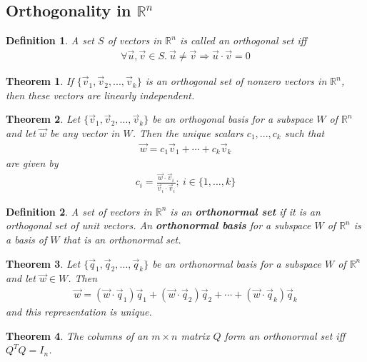 \documentclass{article}
\theoremstyle{sltheorem}
\newtheorem{definition}{Definition}[section]
\newtheorem{theorem}{Theorem}[section]
\begin{document}
\subsection{Orthogonality in $\mathbb{R}^n$}
\begin{definition}
    A set $S$ of vectors in $\mathbb{R}^n$ is called an orthogonal set iff
    \begin{align*}
        \forall \vec u, \vec v\in S.\: \vec u \not= \vec v \Rightarrow \vec u \cdot \vec v = 0
    \end{align*}
\end{definition}
\begin{theorem}
    If $\{\vec v_1, \vec v_2, ...,\vec v_k\}$ is an orthogonal set of nonzero vectors in $\mathbb{R}^n$, then these vectors are linearly independent.
\end{theorem}
\begin{theorem}
    Let $\{\vec v_1, \vec v_2, ..., \vec v_k\}$ be an orthogonal basis for a subspace $W$ of $\mathbb{R}^n$ and let $\vec w$ be any vector in $W$. Then the unique scalars $c_1, ..., c_k$ such that
    \begin{align*}
        \vec w = c_1\vec v_1 + \cdots + c_k\vec v_k
    \end{align*}
    are given by
    \begin{align*}
        c_i = \frac{\vec w \cdot \vec v_i}{\vec v_i \cdot \vec v_i}; \: i \in \{1, ..., k\}
    \end{align*}
\end{theorem}
\begin{definition}
    A set of vectors in $\mathbb{R}^n$ is an \textbf{orthonormal set} if it is an orthogonal set of unit vectors. An \textbf{orthonormal basis} for a subspace $W$ of $\mathbb{R}^n$ is a basis of $W$ that is an orthonormal set. 
\end{definition}
\begin{theorem}
    Let $\{\vec q_1, \vec q_2, ..., \vec q_k\}$ be an orthonormal basis for a subspace $W$ of $\mathbb{R}^n$ and let $\vec w\in W$. Then
    \begin{align*}
        \vec w = (\vec w \cdot \vec q_1)\vec q_1 + (\vec w\cdot\vec q_2)\vec q_2 + \cdots + (\vec w\cdot\vec q_k)\vec q_k
    \end{align*}
    and this representation is unique.
\end{theorem}
\begin{theorem}
    The columns of an $m\times n$ matrix $Q$ form an orthonormal set iff $Q^TQ=I_n$.
\end{theorem}
\end{document}
